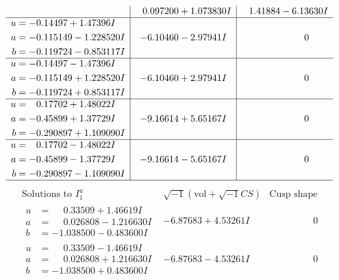 \documentclass[1p]{elsarticle_modified}
\theoremstyle{definition}
\newcommand{\I}{\sqrt{-1}}
\begin{document}
$$\begin{array}{c|c|c}
 & \phantom{-}0.097200 + 1.073830 I & \phantom{-}1.41884 - 6.13630 I \\ \hline\begin{aligned}
u &= -0.14497 + 1.47396 I \\
a &= -0.115149 - 1.228520 I \\
b &= -0.119724 - 0.853117 I\end{aligned}
 & -6.10460 - 2.97941 I & \phantom{-0.000000 } 0 \\ \hline\begin{aligned}
u &= -0.14497 - 1.47396 I \\
a &= -0.115149 + 1.228520 I \\
b &= -0.119724 + 0.853117 I\end{aligned}
 & -6.10460 + 2.97941 I & \phantom{-0.000000 } 0 \\ \hline\begin{aligned}
u &= \phantom{-}0.17702 + 1.48022 I \\
a &= -0.45899 + 1.37729 I \\
b &= -0.290897 + 1.109090 I\end{aligned}
 & -9.16614 + 5.65167 I & \phantom{-0.000000 } 0 \\ \hline\begin{aligned}
u &= \phantom{-}0.17702 - 1.48022 I \\
a &= -0.45899 - 1.37729 I \\
b &= -0.290897 - 1.109090 I\end{aligned}
 & -9.16614 - 5.65167 I & \phantom{-0.000000 } 0\\
 \hline 
 \end{array}$$\newpage$$\begin{array}{c|c|c}  
\text{Solutions to }I^u_{1}& \I (\text{vol} + \sqrt{-1}CS) & \text{Cusp shape}\\
 \hline 
\begin{aligned}
u &= \phantom{-}0.33509 + 1.46619 I \\
a &= \phantom{-}0.026808 - 1.216630 I \\
b &= -1.038500 - 0.483600 I\end{aligned}
 & -6.87683 + 4.53261 I & \phantom{-0.000000 } 0 \\ \hline\begin{aligned}
u &= \phantom{-}0.33509 - 1.46619 I \\
a &= \phantom{-}0.026808 + 1.216630 I \\
b &= -1.038500 + 0.483600 I\end{aligned}
 & -6.87683 - 4.53261 I & \phantom{-0.000000 } 0 \\ \hline\begin{aligned}

\end{aligned}
\end{array}$$
\end{document}
